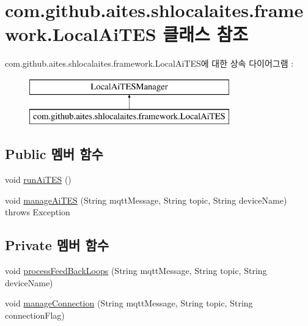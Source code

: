\hypertarget{classcom_1_1github_1_1aites_1_1shlocalaites_1_1framework_1_1_local_ai_t_e_s}{}\section{com.\+github.\+aites.\+shlocalaites.\+framework.\+Local\+Ai\+T\+ES 클래스 참조}
\label{classcom_1_1github_1_1aites_1_1shlocalaites_1_1framework_1_1_local_ai_t_e_s}
com.\+github.\+aites.\+shlocalaites.\+framework.\+Local\+Ai\+T\+E\+S에 대한 상속 다이어그램 \+: \begin{figure}[H]
\begin{center}
\leavevmode
\includegraphics[height=2.000000cm]{classcom_1_1github_1_1aites_1_1shlocalaites_1_1framework_1_1_local_ai_t_e_s}
\end{center}
\end{figure}
\subsection*{Public 멤버 함수}
\begin{DoxyCompactItemize}
\item 
void \mbox{\hyperlink{classcom_1_1github_1_1aites_1_1shlocalaites_1_1framework_1_1_local_ai_t_e_s_abc44ebc127ef39aa8e39c690b92d435a}{run\+Ai\+T\+ES}} ()
\item 
void \mbox{\hyperlink{classcom_1_1github_1_1aites_1_1shlocalaites_1_1framework_1_1_local_ai_t_e_s_a17c17267d25e98f2e75a54f4032b411f}{manage\+Ai\+T\+ES}} (String mqtt\+Message, String topic, String device\+Name)  throws Exception 
\end{DoxyCompactItemize}
\subsection*{Private 멤버 함수}
\begin{DoxyCompactItemize}
\item 
void \mbox{\hyperlink{classcom_1_1github_1_1aites_1_1shlocalaites_1_1framework_1_1_local_ai_t_e_s_a76541bc0beefb5b50d9c6370abff881e}{process\+Feed\+Back\+Loops}} (String mqtt\+Message, String topic, String device\+Name)
\item 
void \mbox{\hyperlink{classcom_1_1github_1_1aites_1_1shlocalaites_1_1framework_1_1_local_ai_t_e_s_ab47f54556f1287c55d41da05b315bd54}{manage\+Connection}} (String mqtt\+Message, String topic, String connection\+Flag)
\end{DoxyCompactItemize}



